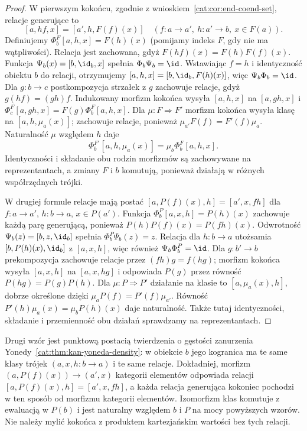 \begin{proof}
W pierwszym kokońcu, zgodnie z wnioskiem~\ref{cat:cor:end-coend-set}, relacje generujące to
\[
 [a,hf,x]=[a',h,F(f)(x)]
 \quad(f:a\to a',\ h:a'\to b,\ x\in F(a)).
\]
Definiujemy $\Phi^F_b[a,h,x]=F(h)(x)$ (pomijamy indeks $F$, gdy nie ma wątpliwości). Relacja jest zachowana, gdyż $F(hf)(x)=F(h)F(f)(x)$. Funkcja $\Psi_b(x)=[b,\id_b,x]$ spełnia $\Phi_b\Psi_b=\id$. Wstawiając $f=h$ i identyczność obiektu $b$ do relacji, otrzymujemy $[a,h,x]=[b,\id_b,F(h)(x)]$, więc $\Psi_b\Phi_b=\id$. Dla $g:b\to c$ postkompozycja strzałek z $g$ zachowuje relacje, gdyż $g(hf)=(gh)f$. Indukowany morfizm kokońca wysyła $[a,h,x]$ na $[a,gh,x]$ i $\Phi^F_c[a,gh,x]=F(g)\Phi^F_b[a,h,x]$. Dla $\mu:F\Rightarrow F'$ morfizm kokońca wysyła klasę na $[a,h,\mu_a(x)]$; zachowuje relacje, ponieważ $\mu_{a'}F(f)=F'(f)\mu_a$. Naturalność $\mu$ względem $h$ daje
\[
 \Phi^{F'}_b[a,h,\mu_a(x)]=\mu_b\Phi^F_b[a,h,x].
\]
Identyczności i składanie obu rodzin morfizmów są zachowywane na reprezentantach, a zmiany $F$ i $b$ komutują, ponieważ działają w różnych współrzędnych trójki.

W drugiej formule relacje mają postać $[a,P(f)(x),h]=[a',x,fh]$ dla $f:a\to a'$, $h:b\to a$, $x\in P(a')$. Funkcja $\Phi^P_b[a,x,h]=P(h)(x)$ zachowuje każdą parę generującą, ponieważ $P(h)P(f)(x)=P(fh)(x)$. Odwrotność $\Psi_b(z)=[b,z,\id_b]$ spełnia $\Phi^P_b\Psi_b(z)=z$. Relacja dla $h:b\to a$ utożsamia $[b,P(h)(x),\id_b]$ z $[a,x,h]$, więc również $\Psi_b\Phi^P_b=\id$. Dla $g:b'\to b$ prekompozycja zachowuje relacje przez $(fh)g=f(hg)$; morfizm kokońca wysyła $[a,x,h]$ na $[a,x,hg]$ i odpowiada $P(g)$ przez równość $P(hg)=P(g)P(h)$. Dla $\mu:P\Rightarrow P'$ działanie na klasie to $[a,\mu_a(x),h]$, dobrze określone dzięki $\mu_aP(f)=P'(f)\mu_{a'}$. Równość $P'(h)\mu_a(x)=\mu_bP(h)(x)$ daje naturalność. Także tutaj identyczności, składanie i przemienność obu działań sprawdzamy na reprezentantach.
\end{proof}
\begin{uwaga}
Drugi wzór jest punktową postacią twierdzenia o gęstości zanurzenia Yonedy~\ref{cat:thm:kan-yoneda-density}: w obiekcie $b$ jego kogranica ma te same klasy trójek $(a,x,h:b\to a)$ i te same relacje. Dokładniej, morfizm $(a,P(f)(x))\to(a',x)$ kategorii elementów odpowiada relacji $[a,P(f)(x),h]=[a',x,fh]$, a każda relacja generująca kokoniec pochodzi w ten sposób od morfizmu kategorii elementów. Izomorfizm klas komutuje z ewaluacją w $P(b)$ i jest naturalny względem $b$ i $P$ na mocy powyższych wzorów. Nie należy mylić kokońca z produktem kartezjańskim wartości bez tych relacji.
\end{uwaga}

